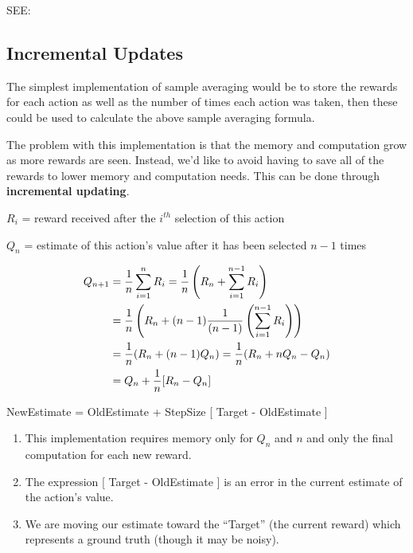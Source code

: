 SEE: 

\subsection{Incremental Updates}
The simplest implementation of sample averaging would be to store the rewards for each action as well as the number of times each action was taken, then these could be used to calculate the above sample averaging formula.

The problem with this implementation is that the memory and computation grow as more rewards are seen. Instead, we’d like to avoid having to save all of the rewards to lower memory and computation needs. This can be done through \textbf{incremental updating}.

\vspace{0.3cm}

$R_i$ = reward received after the $i^{th}$ selection of this action

$Q_n$ = estimate of this action’s value after it has been selected $n-1$ times

\begin{align*}    
    Q_{n+1} &= \displaystyle\dfrac{1}{n} \sum_{i=1}^{n} R_i = \displaystyle\dfrac{1}{n} \left( R_n + \sum_{i=1}^{n-1} R_i \right) \\
    &= \displaystyle\dfrac{1}{n} \left( R_n + (n-1) \displaystyle\dfrac{1}{(n-1)}  \left(\displaystyle\sum_{i=1}^{n-1} R_i\right) \right)\\
    &= \displaystyle\dfrac{1}{n} (R_n + (n-1)Q_n) = \displaystyle\dfrac{1}{n} (R_n + nQ_n - Q_n)\\
    &= Q_n + \displaystyle\dfrac{1}{n} [R_n - Q_n]
\end{align*}

NewEstimate = OldEstimate + StepSize [ Target - OldEstimate ]
\vspace{0.2cm}

\begin{enumerate}
    \item This implementation requires memory only for $Q_n$ and $n$ and only the final computation for each new reward.
    \item The expression [ Target - OldEstimate ] is an error in the current estimate of the action’s value.
    \item We are moving our estimate toward the “Target” (the current reward) which represents a ground truth (though it may be noisy).
\end{enumerate}

